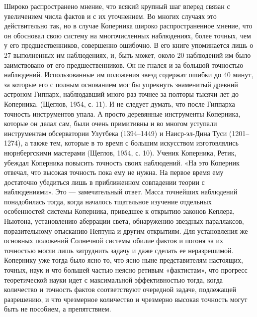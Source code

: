 Широко распространено мнение,  что всякий крупный шаг  вперед связан с
увеличением  числа фактов  и с  их уточнением.  Во многих  случаях это
действительно  так,  но  в случае  Коперника  широко  распространенное
мнение, что  он обосновал свою систему  на многочисленных наблюдениях,
более  точных,  чем  у   его  предшественников,  совершенно  ошибочно.
В  его  книге  упоминается  лишь  о  27  выполненных  им  наблюдениях,
и,  быть  может, около  20  наблюдений  им  было заимствовано  от  его
предшественников.  Он не  гнался  и за  большой точностью  наблюдений.
Использованные  им положения  звезд содержат  ошибки до  40 минут,  за
которые его  с полным основанием  мог бы упрекнуть  знаменитый древний
астроном Гиппарх, наблюдавший  много раз точнее за  полторы тысячи лет
до  Коперника.  (Щеглов,  1954,  с.  11). И  не  следует  думать,  что
после  Гиппарха  точность  инструментов  упала.  А  просто  деревянные
инструменты Коперника, которые  он делал сам, были  очень примитивны и
во многом  уступали инструментам обсерватории Улутбека  (1394--1449) и
Наиср-эл-Дина Туси  (1201--1274), а  также тем, которые  в то  время с
большим  искусством  изготовлялись  нюрнбергскими  мастерами  (Щеглов,
1954,  с. 10).  Ученик  Коперника, Ретик,  убеждал Коперника  повысить
точность  своих  наблюдений. «На  это  Коперник  отвечал, что  высокая
точность пока ему  не нужна. На первое время  ему достаточно убедиться
лишь  в  приближенном  совпадении  теории  с  наблюдениями».  Это  ---
замечательный  ответ. Масса  точнейших наблюдений  понадобилась тогда,
когда  началось  тщательное  изучение отдельных  особенностей  системы
Коперника, приведшее к открытию законов Кеплера, Ньютона, установлению
аберрации  света,  обнаружению  звездных  параллаксов,  поразительному
отысканию  Нептуна и  другим открытиям.  Для установления  же основных
положений Солнечной  системы обилие  фактов и  погоня за  их точностью
могли лишь затруднить задачу и даже сделать ее неразрешимой. Копернику
уже  тогда  было ясно  то,  что  ясно ныне  представителям  настоящих,
точных,  наук и  что большей  частью неясно  ретивым «фактистам»,  что
прогресс теоретической науки идет с максимальной эффективностью тогда,
когда  количество и  точность фактов  соответствуют очередной  задаче,
подлежащей разрешению, и что чрезмерное количество и чрезмерно высокая
точность могут быть не пособием, а препятствием.

